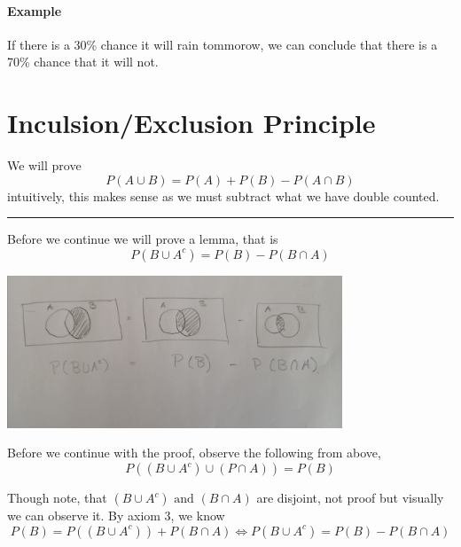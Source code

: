 \documentclass[11pt]{book}
\begin{document}
\paragraph{Example} 
If there is a 30\% chance it will rain tommorow, we can conclude that there is a 70\% chance that it will not.


\section{Inculsion/Exclusion Principle}%
\label{sec:inculsion_exclusion_principle}

We will prove 
\[
P\left(A\cup B\right) = P\left(A\right)  + P\left(B\right)  - P\left(A \cap B\right) 
\]
intuitively, this makes sense as we must subtract what we have double counted.

\begin{center}
    \noindent\rule{8cm}{0.4pt}
\end{center}


Before we continue we will prove a lemma, that is
\[
    P\left(B \cup A^{c} \right) = P\left(B\right)  - P\left(B \cap A\right) 
\]
\begin{center}
    \includegraphics[width=100mm]{assets/p1.jpg} 
\end{center}

Before we continue with the proof, observe the following from above, 
\[
    P\left(\left( B \cup A^{c}  \right) \cup \left( P \cap A \right) \right) = P\left(B\right) 
\]

Though note, that $\left( B \cup A^{c}  \right)\text{ and }  \left( B \cap A \right) $ are disjoint, not proof but visually we can observe it. By axiom 3, we know 
\[
    P\left(B\right) = P\left(\left( B\cup A^{c}  \right) \right)  + P\left(B\cap A\right) \Leftrightarrow P\left(B\cup A^{c} \right) = P\left(B\right)  - P\left(B\cap A\right) 
\]
\end{document}
